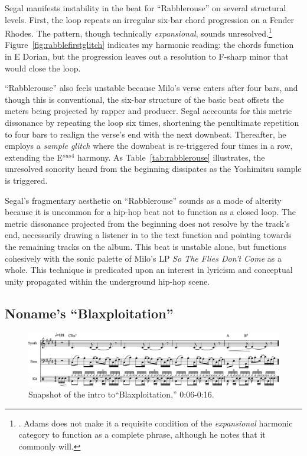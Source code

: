 Segal manifests instability in the beat for ``Rabblerouse'' on several structural levels. First, the loop repeats an irregular six-bar chord progression on a Fender Rhodes. The pattern, though technically \emph{expansional}, sounds unresolved.\footnote{\cite{kyleadamsHarmonicSyntacticMotivic2020}. Adams does not make it a requisite condition of the \emph{expansional} harmonic category to function as a complete phrase, although he notes that it commonly will.} Figure~\ref{fig:rabblefirstglitch} indicates my harmonic reading: the chords function in E Dorian, but the progression leaves out a resolution to F-sharp minor that would close the loop.

``Rabblerouse'' also feels unstable because Milo's verse enters after four bars, and though this is conventional, the six-bar structure of the basic beat offsets the meters being projected by rapper and producer. Segal acccounts for this metric dissonance by repeating the loop six times, shortening the penultimate repetition to four bars to realign the verse's end with the next downbeat. Thereafter, he employs a \emph{sample glitch} where the downbeat is re-triggered four times in a row, extending the E$^{sus4}$ harmony. As Table~\ref{tab:rabblerouse} illustrates, the unresolved sonority heard from the beginning dissipates as the Yoshimitsu sample is triggered.


\normalsize Segal's fragmentary aesthetic on ``Rabblerouse'' sounds as a mode of alterity because it is uncommon for a hip-hop beat not to function as a closed loop. The metric dissonance projected from the beginning does not resolve by the track's end, necessarily drawing a listener in to the text function and pointing towards the remaining tracks on the album. This beat is unstable alone, but functions cohesively with the sonic palette of Milo's LP \textit{So The Flies Don't Come} as a whole. This technique is predicated upon an interest in lyricism and conceptual unity propagated within the underground hip-hop scene.

\subsection*{\centering Noname's ``Blaxploitation''}

\begin{figure}[ht]
    \centering
    \includegraphics[width=\textwidth]{images/figures/chp 02/006016blaxintro.pdf}
    \caption{Snapshot of the intro to``Blaxploitation,'' 0:06-0:16.}
    \label{fig:blaxploitationintro}
\end{figure}

